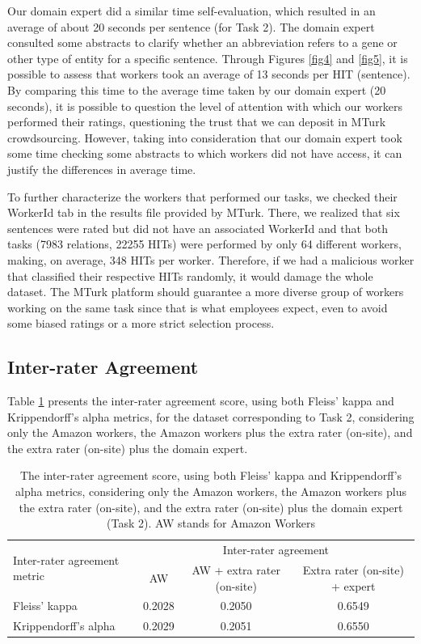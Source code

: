 Our domain expert did a similar time self-evaluation, which resulted in an average of about 20 seconds per sentence (for Task 2). The domain expert consulted some abstracts to clarify whether an abbreviation refers to a gene or other type of entity for a specific sentence. Through Figures \ref{fig4} and \ref{fig5}, it is possible to assess that workers took an average of 13 seconds per HIT (sentence). By comparing this time to the average time taken by our domain expert (20 seconds), it is possible to question the level of attention with which our workers performed their ratings, questioning the trust that we can deposit in MTurk crowdsourcing. However, taking into consideration that our domain expert took some time checking some abstracts to which workers did not have access, it can justify the differences in average time.

To further characterize the workers that performed our tasks, we checked their WorkerId tab in the results file provided by MTurk. There, we realized that six sentences were rated but did not have an associated WorkerId and that both tasks (7983 relations, 22255 HITs) were performed by only 64 different workers, making, on average, 348 HITs per worker. Therefore, if we had a malicious worker that classified their respective HITs randomly, it would damage the whole dataset. The MTurk platform should guarantee a more diverse group of workers working on the same task since that is what employees expect, even to avoid some biased ratings or a more strict selection process.

\subsection{Inter-rater Agreement}

Table \ref{tab3} presents the inter-rater agreement score, using both Fleiss’ kappa \citep{mchugh2012interrater} and Krippendorff’s alpha \citep{krippendorff2011computing} metrics, for the dataset corresponding to Task 2, considering only the Amazon workers, the Amazon workers plus the extra rater (on-site), and the extra rater (on-site) plus the domain expert.

\begin{table}[h]
\centering
\caption[Inter-rater Agreement Scores]{The inter-rater agreement score, using both Fleiss’ kappa and  Krippendorff’s alpha metrics, considering only the Amazon workers, the Amazon workers plus the extra rater (on-site), and the extra rater (on-site) plus the domain expert (Task 2). AW stands for Amazon Workers}\label{tab3}
\begin{tabular}{lccc}
\hline
\multirow{2}{*}{Inter-rater agreement metric} & \multicolumn{3}{c}{Inter-rater agreement} \\
\cline{2-4}
& AW & AW + extra rater (on-site) & Extra rater (on-site) + expert \\
\hline
Fleiss' kappa & 0.2028 & 0.2050 & 0.6549 \\
Krippendorff’s alpha & 0.2029 & 0.2051 & 0.6550 \\
\hline
\end{tabular}
\end{table}

